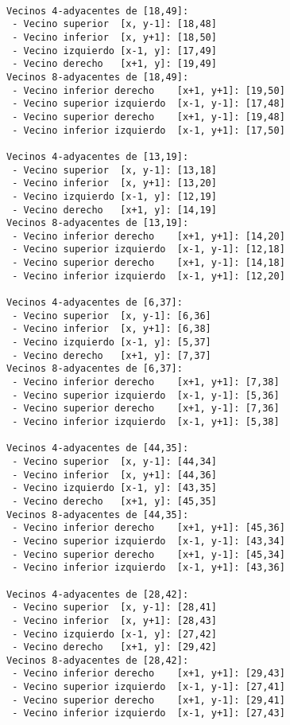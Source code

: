 \documentclass[
  journal=largetwo,
  manuscript=Practica-Dos,
  year=2024-1, %
  volume=37,
  spanish, %
]{cup-journal}
\begin{document}
\begin{lstlisting}[style=Matlab-editor, caption=Vecindades obtenidas de los cinco pixeles del punto seis, basicstyle=\fontsize{8}{12}\selectfont]

Vecinos 4-adyacentes de [18,49]:
 - Vecino superior  [x, y-1]: [18,48]
 - Vecino inferior  [x, y+1]: [18,50]
 - Vecino izquierdo [x-1, y]: [17,49]
 - Vecino derecho   [x+1, y]: [19,49]
Vecinos 8-adyacentes de [18,49]:
 - Vecino inferior derecho    [x+1, y+1]: [19,50]
 - Vecino superior izquierdo  [x-1, y-1]: [17,48]
 - Vecino superior derecho    [x+1, y-1]: [19,48]
 - Vecino inferior izquierdo  [x-1, y+1]: [17,50]

Vecinos 4-adyacentes de [13,19]:
 - Vecino superior  [x, y-1]: [13,18]
 - Vecino inferior  [x, y+1]: [13,20]
 - Vecino izquierdo [x-1, y]: [12,19]
 - Vecino derecho   [x+1, y]: [14,19]
Vecinos 8-adyacentes de [13,19]:
 - Vecino inferior derecho    [x+1, y+1]: [14,20]
 - Vecino superior izquierdo  [x-1, y-1]: [12,18]
 - Vecino superior derecho    [x+1, y-1]: [14,18]
 - Vecino inferior izquierdo  [x-1, y+1]: [12,20]

Vecinos 4-adyacentes de [6,37]:
 - Vecino superior  [x, y-1]: [6,36]
 - Vecino inferior  [x, y+1]: [6,38]
 - Vecino izquierdo [x-1, y]: [5,37]
 - Vecino derecho   [x+1, y]: [7,37]
Vecinos 8-adyacentes de [6,37]:
 - Vecino inferior derecho    [x+1, y+1]: [7,38]
 - Vecino superior izquierdo  [x-1, y-1]: [5,36]
 - Vecino superior derecho    [x+1, y-1]: [7,36]
 - Vecino inferior izquierdo  [x-1, y+1]: [5,38]

Vecinos 4-adyacentes de [44,35]:
 - Vecino superior  [x, y-1]: [44,34]
 - Vecino inferior  [x, y+1]: [44,36]
 - Vecino izquierdo [x-1, y]: [43,35]
 - Vecino derecho   [x+1, y]: [45,35]
Vecinos 8-adyacentes de [44,35]:
 - Vecino inferior derecho    [x+1, y+1]: [45,36]
 - Vecino superior izquierdo  [x-1, y-1]: [43,34]
 - Vecino superior derecho    [x+1, y-1]: [45,34]
 - Vecino inferior izquierdo  [x-1, y+1]: [43,36]

Vecinos 4-adyacentes de [28,42]:
 - Vecino superior  [x, y-1]: [28,41]
 - Vecino inferior  [x, y+1]: [28,43]
 - Vecino izquierdo [x-1, y]: [27,42]
 - Vecino derecho   [x+1, y]: [29,42]
Vecinos 8-adyacentes de [28,42]:
 - Vecino inferior derecho    [x+1, y+1]: [29,43]
 - Vecino superior izquierdo  [x-1, y-1]: [27,41]
 - Vecino superior derecho    [x+1, y-1]: [29,41]
 - Vecino inferior izquierdo  [x-1, y+1]: [27,43]

\end{lstlisting}
\end{document}
